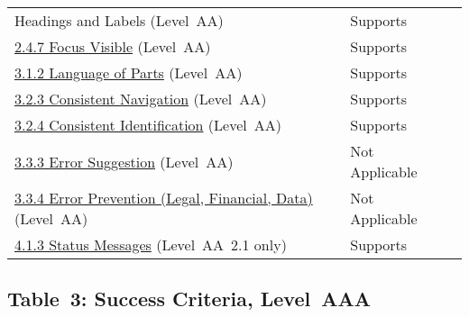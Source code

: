 \documentclass{report}
\begin{document}
\begin{longtable}{p{}<{\RaggedRight}p{}<{\RaggedRight}p{}<{\RaggedRight}}
{  Headings and Labels} (Level~AA) & Supports\\
  \href{http://www.w3.org/TR/WCAG20/#navigation-mechanisms-focus-visible}{2.4.7
  Focus Visible} (Level~AA) & Supports\\
  \href{http://www.w3.org/TR/WCAG20/#meaning-other-lang-id}{3.1.2
  Language of Parts} (Level~AA) & Supports\\
  \href{http://www.w3.org/TR/WCAG20/#consistent-behavior-consistent-locations}{3.2.3
  Consistent Navigation} (Level~AA) & Supports\\
  \href{http://www.w3.org/TR/WCAG20/#consistent-behavior-consistent-functionality}{3.2.4
  Consistent Identification} (Level~AA) & Supports\\
  \href{http://www.w3.org/TR/WCAG20/#minimize-error-suggestions}{3.3.3
  Error Suggestion} (Level~AA) & Not Applicable\\
  \href{http://www.w3.org/TR/WCAG20/#minimize-error-reversible}{3.3.4
  Error Prevention (Legal, Financial, Data)} (Level~AA) & Not
                                                          Applicable\\
  \href{https://www.w3.org/TR/WCAG21/#status-messages}{4.1.3 Status
  Messages} (Level~AA~2.1 only) & Supports\\
\end{longtable}

\subsection{Table~3:  Success Criteria, Level~AAA}
\label{sec:WCAG-AAA}
\end{document}
